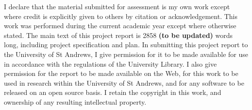 I declare that the material submitted for assessment is my own work except where credit is explicitly given to others by citation or acknowledgement. This work was performed during the current academic year except where otherwise stated. The main text of this project report is 2858 \textbf{(to be updated)} words long, including project specification and plan. In submitting this project report to the University of St Andrews, I give permission for it to be made available for use in accordance with the regulations of the University Library. I also give permission for the report to be made available on the Web, for this work to be used in research within the University of St Andrews, and for any software to be released on an open source basis. I retain the copyright in this work, and ownership of any resulting intellectual property.
